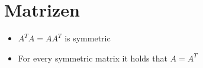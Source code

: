 \setcounter{section}{0} %

\section{Matrizen}
	
\begin{itemize}
	\item $A^TA=AA^T$ is symmetric
	\item For every symmetric matrix it holds that $A=A^T$
\end{itemize}	
	